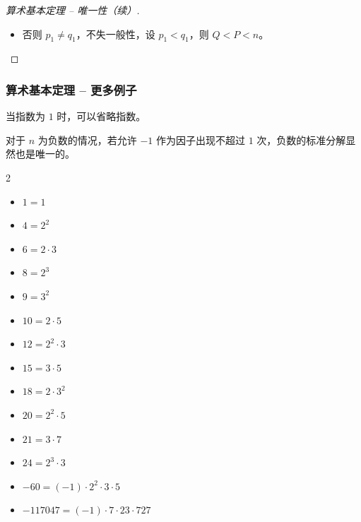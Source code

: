 \documentclass{../pkslide}
\begin{document}
\begin{frame}
{\begin{proof}[算术基本定理 -- 唯一性（续）]
      \begin{itemize}
        \item 否则 $p_1 \ne q_1$，不失一般性，设 $p_1 < q_1$，则 $Q < P < n$。
          
          
          
          
      \end{itemize}
      
    \end{proof}
  }
\end{frame}

\begin{frame}
  \frametitle{算术基本定理 -- 更多例子}
  
  当指数为 $1$ 时，可以省略指数。
  
  对于 $n$ 为负数的情况，若允许 $-1$ 作为因子出现不超过 $1$ 次，负数的标准分解显然也是唯一的。
  
  \begin{mymulticols}[l][l]{2}
    \begin{itemize}
      \item $1 = 1$
      \item $4 = 2^2$
      \item $6 = 2 \cdot 3$
      \item $8 = 2^3$
      \item $9 = 3^2$
      \item $10 = 2 \cdot 5$
      \item $12 = 2^2 \cdot 3$
      \item $15 = 3 \cdot 5$
      \item $18 = 2 \cdot 3^2$
      \item $20 = 2^2 \cdot 5$
      \item $21 = 3 \cdot 7$
      \item $24 = 2^3 \cdot 3$
      \item $-60 = (-1) \cdot 2^2 \cdot 3 \cdot 5$
      \item $-117047 = (-1) \cdot 7 \cdot 23 \cdot 727$
    \end{itemize}
  \end{mymulticols}
\end{frame}
\end{document}
